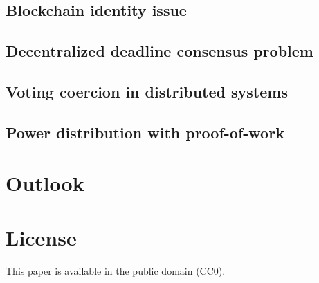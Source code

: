 \documentclass[9pt,oneside]{amsart}
\begin{document}
\begin{multicols}{2}
\subsection{Blockchain identity issue}

\subsection{Decentralized deadline consensus problem}

\subsection{Voting coercion in distributed systems}



\subsection{Power distribution with proof-of-work}

\section{Outlook}

\section{License}
This paper is available in the public domain (CC0).


\end{multicols}
\end{document}
